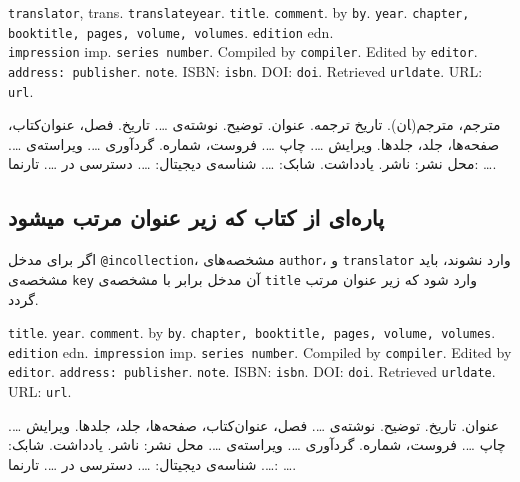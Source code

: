\documentclass[a4paper,11pt]{article}
\begin{document}
\begin{itemize}[nosep]
\begin{latin}
\item[] []
{\tt translator}, trans. {\tt translateyear}. {\tt title}. {\tt comment}. by {\tt by}. {\tt year}. {\tt chapter, booktitle, pages, volume, volumes}. {\tt edition} edn. \\{\tt impression} imp. {\tt series number}. Compiled by {\tt compiler}. Edited by {\tt editor}. {\tt address: publisher}. {\tt note}. ISBN: {\tt isbn}. DOI: {\tt doi}. Retrieved {\tt urldate}. URL: {\tt url}. 
\end{latin}

\item[] []
{\persianttfamily مترجم}، مترجم(‍ان). {\persianttfamily تاریخ ترجمه}. {\persianttfamily عنوان}. {\persianttfamily توضیح}. نوشته‌ی {\persianttfamily …}. {\persianttfamily تاریخ}. {\persianttfamily فصل، عنوان‌کتاب، صفحه‌ها، جلد، جلدها}. ویرایش {\persianttfamily …}. چاپ {\persianttfamily …}. {\persianttfamily فروست، شماره}. گردآوری {\persianttfamily …}. ویراسته‌ی {\persianttfamily …}. {\persianttfamily محل نشر: ناشر}. {\persianttfamily یادداشت}. شابک: {\persianttfamily …}. شناسه‌ی دیجیتال: {\persianttfamily …}. دسترسی در {\persianttfamily …}. تارنما: {\persianttfamily …}. 
\end{itemize}





\subsection{پاره‌ای از کتاب که زیر عنوان مرتب میشود}
اگر برای مدخل \verb|@incollection|، مشخصه‌های \verb|author|، و \verb|translator| وارد نشوند، باید مشخصه‌ی \verb|key| آن مدخل برابر با مشخصه‌ی \verb|title| وارد شود که زیر عنوان مرتب گردد.

\begin{itemize}[nosep]
\begin{latin}
\item[] []
{\tt title}. {\tt year}. {\tt comment}. by {\tt by}. {\tt chapter, booktitle, pages, volume, volumes}. {\tt edition} edn. {\tt impression} imp. {\tt series number}. Compiled by {\tt compiler}. Edited by {\tt editor}. {\tt address: publisher}. {\tt note}. ISBN: {\tt isbn}. DOI: {\tt doi}. Retrieved {\tt urldate}. URL: {\tt url}. 
\end{latin}

\item[] []
{\persianttfamily عنوان}. {\persianttfamily تاریخ}. {\persianttfamily توضیح}. نوشته‌ی {\persianttfamily …}. {\persianttfamily فصل، عنوان‌کتاب، صفحه‌ها، جلد، جلدها}. ویرایش {\persianttfamily …}. چاپ {\persianttfamily …}. {\persianttfamily فروست، شماره}. گردآوری {\persianttfamily …}. ویراسته‌ی {\persianttfamily …}. {\persianttfamily محل نشر: ناشر}. {\persianttfamily یادداشت}. شابک: {\persianttfamily …}. شناسه‌ی دیجیتال: {\persianttfamily …}. دسترسی در {\persianttfamily …}. تارنما: {\persianttfamily …}. 
\end{itemize}
\end{document}
